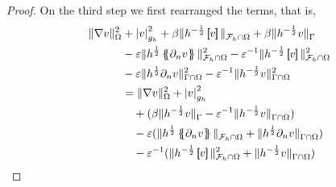 \begin{proof}
 On the third step we first rearranged the terms, that is,
 \[
     \begin{split}
   \| \nabla v \|_{  \Omega }^{ 2 } & + \left\lvert v \right\rvert_{ g_{h} }^{ 2 } + \beta \| h^{-\frac{1}{2}} \jump{ v }   \|_{\mathcal{F} _{h} \cap \Omega   }^{  }   + \beta \| h^{-\frac{1}{2}}  v    \|_{ \Gamma}^{  }
\\  &- \varepsilon \| h^{\frac{1}{2}}  \mean{  \partial _{n} v}      \|_{ \mathcal{F} _{h} \cap \Omega  }^{2  } - \varepsilon ^{-1} \| h^{-\frac{1}{2}} \jump{ v }   \|_{\mathcal{F} _{h} \cap \Omega   }^{ 2 }
\\ &-  \varepsilon \| h^{\frac{1}{2}} \partial _{n} v \|_{ \Gamma \cap \Omega  }^{2  } -  \varepsilon ^{-1} \| h^{-\frac{1}{2}} v \|_{  \Gamma \cap  \Omega }^{ 2 } \\
&=  \| \nabla v \|_{  \Omega }^{ 2 }  + \left\lvert v \right\rvert_{ g_{h} }^{ 2 } \\
&\quad  + ( \beta \| h^{-\frac{1}{2}} v \|_{\Gamma   }^{  } - \varepsilon ^{ -1}\| h^{-\frac{1}{2}} v \|_{\Gamma \cap \Omega    }^{  } )  \\
&\quad  -  \varepsilon ( \| h^{\frac{1}{2}} \mean{ \partial _{n} v }    \|_{  \mathcal{F}_{h} \cap \Omega  }^{  } + \| h^{\frac{1}{2}} \partial _{n} v \|_{ \Gamma \cap \Omega  }^{  }  ) \\
&\quad  - \varepsilon ^{-1} ( \| h^{-\frac{1}{2}} \jump{ v }   \|_{ \mathcal{F}_{h} \cap \Omega   }^{2  } + \| h^{-\frac{1}{2}} v \|_{ \Gamma \cap \Omega   }^{  }  )
     \end{split}
 \]

\end{proof}



